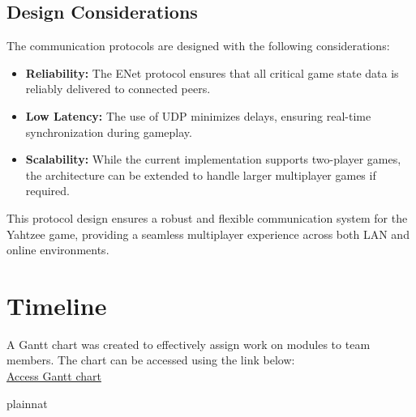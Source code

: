 \documentclass[12pt, titlepage]{article}
\begin{document}
\subsection{Design Considerations}

The communication protocols are designed with the following considerations:
\begin{itemize}
    \item \textbf{Reliability:} The ENet protocol ensures that all critical game state data is reliably delivered to connected peers.
    \item \textbf{Low Latency:} The use of UDP minimizes delays, ensuring real-time synchronization during gameplay.
    \item \textbf{Scalability:} While the current implementation supports two-player games, the architecture can be extended to handle larger multiplayer games if required.
\end{itemize}

This protocol design ensures a robust and flexible communication system for the Yahtzee game, providing a seamless multiplayer experience across both LAN and online environments.


\section{Timeline}

A Gantt chart was created to effectively assign work on modules to team members. The chart can be accessed using the link below:\\

\href{https://mcmasteru365-my.sharepoint.com/:x:/r/personal/bhatth14_mcmaster_ca/Documents/Rev0%20Gnatt%20Chart.xlsx?d=w7c7c84af07004c328dc311a8721a5adb&csf=1&web=1&e=d8G3hJ}{Access Gantt chart}

 {plainnat}


\newpage{}
\end{document}
